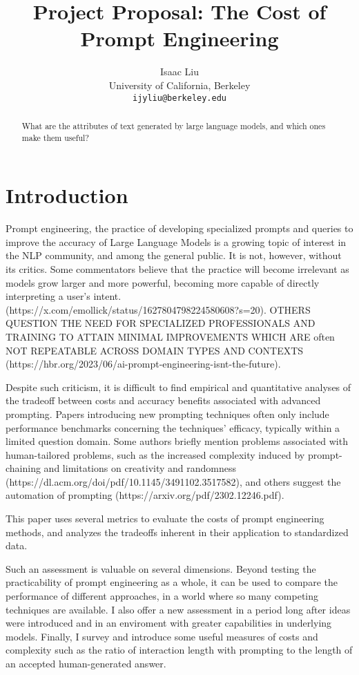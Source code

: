 \documentclass[11pt]{article}
\title{Project Proposal: The Cost of Prompt Engineering}
\author{Isaac Liu \\
  University of California, Berkeley \\
  \texttt{ijyliu@berkeley.edu}}
\begin{document}
\maketitle
\begin{abstract}
What are the attributes of text generated by large language models, and which ones make them useful?
\end{abstract}

\section{Introduction}

Prompt engineering, the practice of developing specialized prompts and queries to improve the accuracy of Large Language Models is a growing topic of interest in the NLP community, and among the general public. It is not, however, without its critics. Some commentators believe that the practice will become irrelevant as models grow larger and more powerful, becoming more capable of directly interpreting a user's intent. (https://x.com/emollick/status/1627804798224580608?s=20). OTHERS QUESTION THE NEED FOR SPECIALIZED PROFESSIONALS AND TRAINING TO ATTAIN MINIMAL IMPROVEMENTS WHICH ARE often NOT REPEATABLE ACROSS DOMAIN TYPES AND CONTEXTS (https://hbr.org/2023/06/ai-prompt-engineering-isnt-the-future). 

Despite such criticism, it is difficult to find empirical and quantitative analyses of the tradeoff between costs and accuracy benefits associated with advanced prompting. Papers introducing new prompting techniques often only include performance benchmarks concerning the techniques' efficacy, typically within a limited question domain. Some authors briefly mention problems associated with human-tailored problems, such as the increased complexity induced by prompt-chaining and limitations on creativity and randomness (https://dl.acm.org/doi/pdf/10.1145/3491102.3517582), and others suggest the automation of prompting (https://arxiv.org/pdf/2302.12246.pdf).

This paper uses several metrics to evaluate the costs of prompt engineering methods, and analyzes the tradeoffs inherent in their application to standardized data.

Such an assessment is valuable on several dimensions. Beyond testing the practicability of prompt engineering as a whole, it can be used to compare the performance of different approaches, in a world where so many competing techniques are available. I also offer a new assessment in a period long after ideas were introduced and in an enviroment with greater capabilities in underlying models. Finally, I survey and introduce some useful measures of costs and complexity such as the ratio of interaction length with prompting to the length of an accepted human-generated answer.
\end{document}
